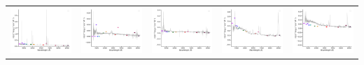 \begin{center}
\begin{longtable}{l l l l l }
    \includegraphics[width=0.2\linewidth, clip]{Figs/Figs-sdss/spec-6780-56267-0244-STRIPE82-0053-009665.pdf} & \includegraphics[width=0.2\linewidth, clip]{Figs/Figs-sdss/spec-6780-56577-0280-STRIPE82-0053-044359.pdf} & \includegraphics[width=0.2\linewidth, clip]{Figs/Figs-sdss/spec-6781-56274-0268-STRIPE82-0057-039669.pdf} & \includegraphics[width=0.2\linewidth, clip]{Figs/Figs-sdss/spec-6781-56274-0387-STRIPE82-0055-012470.pdf} & \includegraphics[width=0.2\linewidth, clip]{Figs/Figs-sdss/spec-6781-56274-0507-STRIPE82-0056-011736.pdf} \\

\end{longtable}
\end{center}
